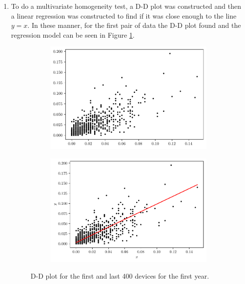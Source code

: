 \documentclass[fleqn]{article}
\begin{document}
\begin{enumerate}[label=\alph*)]
  \item To do a multivariate homogeneity test, a D-D plot was constructed and
    then a linear regression was constructed to find if it was close enough to
    the line $y = x$. In these manner, for the first pair of data the D-D plot
    found and the regression model can be seen in Figure \ref{fig:ddplot400}.
    \begin{figure}[ht]
      \centering
      \begin{subfigure}[b]{0.4\textwidth}
        \centering \includegraphics[scale=.5]{../figs/ddplot-400}
      \end{subfigure}
      \begin{subfigure}[b]{0.4\textwidth}
        \centering
        \includegraphics[scale=.5]{../figs/scatter-vs-model-ddplot-400}
      \end{subfigure}
      \caption{D-D plot for the first and last 400 devices for the first year.}
      \label{fig:ddplot400}
    \end{figure}


\end{enumerate}
\end{document}
